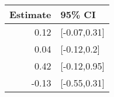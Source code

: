 \begin{tabular}{rl}
  \hline
Estimate & 95\% CI \\ 
  \hline
0.12 & [-0.07,0.31] \\ 
  0.04 & [-0.12,0.2] \\ 
  0.42 & [-0.12,0.95] \\ 
  -0.13 & [-0.55,0.31] \\ 
   \hline
\end{tabular}

